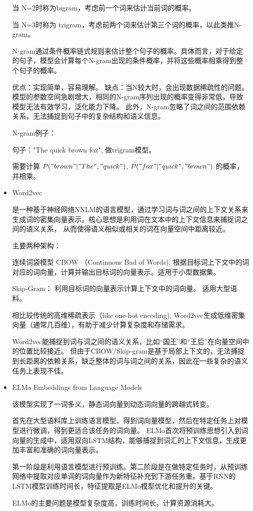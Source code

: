\documentclass{article}
\begin{document}
\begin{itemize}
    当 N=2时称为bigram，考虑前一个词来估计当前词的概率。

    当 N=3时称为 trigram，考虑前两个词来估计第三个词的概率，以此类推N-gram。

    N-gram通过条件概率链式规则来估计整个句子的概率。具体而言，对于给定的句子，模型会计算每个N-gram出现的条件概率，并将这些概率相乘得到整个句子的概率。

    优点：实现简单，容易理解。 缺点：当N较大时，会出现数据稀疏性的问题。模型的参数空间急剧增大，相同的N-gram序列出现的概率变得非常低，导致模型无法有效学习，泛化能力下降。
    此外，N-gram忽略了词之间的范围依赖关系，无法捕捉到句子中的复杂结构和语义信息。

    N-gram例子：

    句子："The quick brown fox", 做trigram模型。

    需要计算 $P("brown" | "The", "quick") $, $P("fox" | "quick", "brown") $ 的概率，并相乘。


    \item Word2vec
    
    是一种基于神经网络NNLM的语言模型，通过学习词与词之间的上下文关系来生成词的密集向量表示。核心思想是利用词在文本中的上下文信息来捕捉词之间的语义关系，
    从而使得语义相似或相关的词在向量空间中距离较近。

    主要两种架构：

    连续词袋模型 CBOW （Continuous Bad of Words). 根据目标词上下文中的词对应的词向量，计算并输出目标词的向量表示。适用于小型数据集。

    Skip-Gram： 利用目标词的向量表示计算上下文中的词向量。 适用大型语料。

    相比较传统的高维稀疏表示（like one-hot encoding), Word2vec生成低维密集向量（通常几百维），有助于减少计算复杂度和存储需求。

    Word2vec能捕捉到词与词之间的语义关系，比如“国王”和“王后”在向量空间中的位置比较接近。
    但由于CBOW/Skip-gram是基于局部上下文的，无法捕捉到长距离的依赖关系，缺乏整体的词与词之间的关系，因此在一些复杂的语义任务上表现不佳。


    \item ELMo Embeddings from Language Models
    
    该模型实现了一词多义，静态词向量到动态词向量的跨越式转变。

    首先在大型语料库上训练语言模型，得到词向量模型，然后在特定任务上对模型进行微调，得到更适合该任务的词向量。
     ELMo首次将预训练思想引入到词向量的生成中，适用双向LSTM结构，能够捕捉到词汇的上下文信息，生成更加丰富和准确的词向量表示。

     第一阶段是利用语言模型进行预训练。第二阶段是在做特定任务时，从预训练网络中提取对应单词的词向量作为新特征补充到下游任务重。基于RNN的LSTM模型训练时间长，特征提取是ELMo模型优化和提升的关键。

     ELMo的主要问题是模型复杂度高，训练时间长，计算资源消耗大。

\end{itemize}

% 
\end{document}
